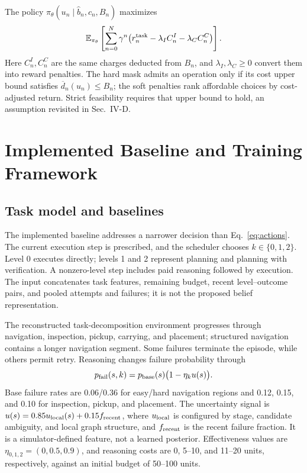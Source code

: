 \documentclass[conference]{IEEEtran}
\newcommand{\E}{\mathbb{E}}
\begin{document}
The policy $\pi_\theta(u_n\mid\widehat b_n,c_n,B_n)$ maximizes
\begin{equation}
 \E_{\pi_\theta}\left[\sum_{n=0}^{N}\gamma^n
 \bigl(r_n^{\rm task}-\lambda_I C_n^I-\lambda_C C_n^C\bigr)\right].
\end{equation}
Here $C_n^I,C_n^C$ are the same charges deducted from $B_n$, and $\lambda_I,\lambda_C\geq0$ convert them into reward penalties. The hard mask admits an operation only if its cost upper bound satisfies $\overline d_n(u_n)\leq B_n$; the soft penalties rank affordable choices by cost-adjusted return. Strict feasibility requires that upper bound to hold, an assumption revisited in Sec.~IV-D.

\section{Implemented Baseline and Training Framework}
\subsection{Task model and baselines}
The implemented baseline addresses a narrower decision than Eq.~\eqref{eq:actions}. The current execution step is prescribed, and the scheduler chooses $k\in\{0,1,2\}$. Level 0 executes directly; levels 1 and 2 represent planning and planning with verification. A nonzero-level step includes paid reasoning followed by execution. The input concatenates task features, remaining budget, recent level--outcome pairs, and pooled attempts and failures; it is not the proposed belief representation.

The reconstructed task-decomposition environment progresses through navigation, inspection, pickup, carrying, and placement; structured navigation contains a longer navigation segment. Some failures terminate the episode, while others permit retry. Reasoning changes failure probability through
\begin{equation}
 p_{\rm fail}(s,k)=p_{\rm base}(s)\bigl(1-\eta_k u(s)\bigr).
\label{eq:failure}
\end{equation}
Base failure rates are 0.06/0.36 for easy/hard navigation regions and 0.12, 0.15, and 0.10 for inspection, pickup, and placement. The uncertainty signal is $u(s)=0.85u_{\rm local}(s)+0.15f_{\rm recent}$, where $u_{\rm local}$ is configured by stage, candidate ambiguity, and local graph structure, and $f_{\rm recent}$ is the recent failure fraction. It is a simulator-defined feature, not a learned posterior. Effectiveness values are $\eta_{0,1,2}=(0,0.5,0.9)$, and reasoning costs are 0, 5--10, and 11--20 units, respectively, against an initial budget of 50--100 units.
\end{document}
